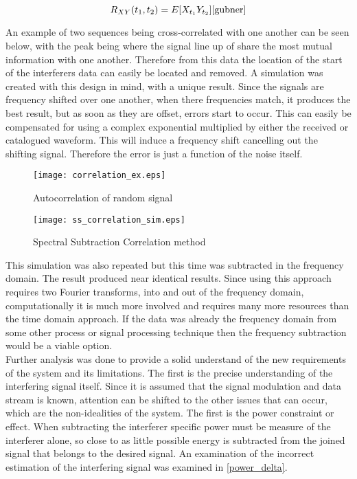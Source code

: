\begin{equation}\label{cross}
R_{XY}(t_{1},t_{2})=E[X_{t_{1}}Y_{t_{2}}] \cite{gubner}
\end{equation}

An example of two sequences being cross-correlated with one another can be seen below, with the peak being where the signal line up of share the most mutual information with one another.  Therefore from this data the location of the start of the interferers data can easily be located and removed.  A simulation was created with this design in mind, with a unique result.  Since the signals are frequency shifted over one another, when there frequencies match, it produces the best result, but as soon as they are offset, errors start to occur.  This can easily be compensated for using a complex exponential multiplied by either the received or catalogued waveform.  This will induce a frequency shift cancelling out the shifting signal.  Therefore the error is just a function of the noise itself.\\

\begin{figure}[!ht]\label{ss_correlation_ex}
\centering
\texttt{[image: correlation\_ex.eps]}
\caption{Autocorrelation of random signal}
\end{figure} 

\begin{figure}[!ht]\label{ss_correlation}
\centering
\texttt{[image: ss\_correlation\_sim.eps]}
\caption{Spectral Subtraction Correlation method}
\end{figure} 

This simulation was also repeated but this time was subtracted in the frequency domain.  The result produced near identical results.  Since using this approach requires two Fourier transforms, into and out of the frequency domain, computationally it is much more involved and requires many more resources than the time domain approach.  If the data was already the frequency domain from some other process or signal processing technique then the frequency subtraction would be a viable option.\\

Further analysis was done to provide a solid understand of the new requirements of the system and its limitations.  The first is the precise understanding of the interfering signal itself.  Since it is assumed that the signal modulation and data stream is known, attention can be shifted to the other issues that can occur, which are the non-idealities of the system.  The first is the power constraint or effect.  When subtracting the interferer specific power must be measure of the interferer alone, so close to as little possible energy is subtracted from the joined signal that belongs to the desired signal.  An examination of the incorrect estimation of the interfering signal was examined in \ref{power_delta}.

